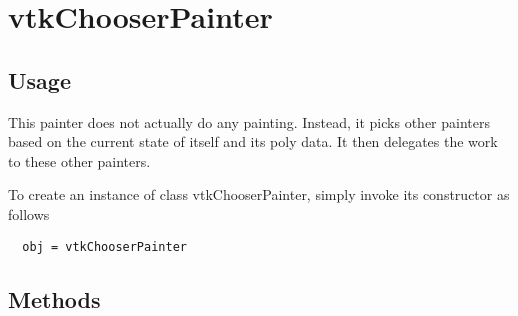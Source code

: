 \section{vtkChooserPainter}

\subsection{Usage}


 This painter does not actually do any painting.  Instead, it picks other
 painters based on the current state of itself and its poly data.  It then
 delegates the work to these other painters.


To create an instance of class vtkChooserPainter, simply
invoke its constructor as follows
\begin{verbatim}
  obj = vtkChooserPainter
\end{verbatim}
\subsection{Methods}

